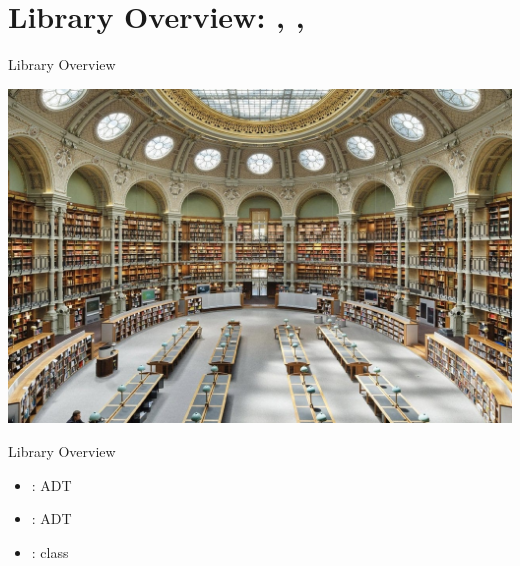 \section{Library Overview: , , }

{  %
\begin{frame}{Library Overview}
  \centering

   \includegraphics[height=0.8\textheight]{lib.jpg}
\end{frame}
}



\begin{frame}{Library Overview}
  \begin{itemize}
  \item {}:  ADT
  \item {}:  ADT
  \item {}:  class
  \end{itemize}
\end{frame}





